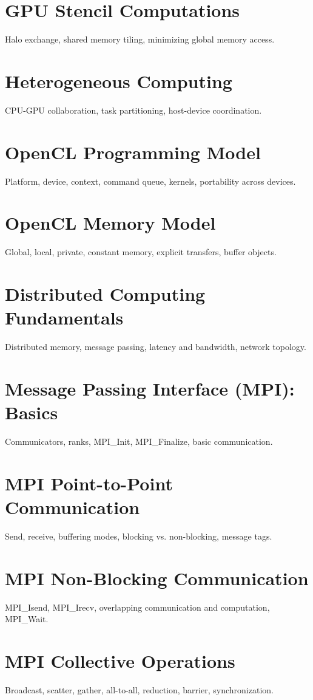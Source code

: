 \chapter{GPU Stencil Computations}
Halo exchange, shared memory tiling, minimizing global memory access.

\chapter{Heterogeneous Computing}
CPU-GPU collaboration, task partitioning, host-device coordination.

\chapter{OpenCL Programming Model}
Platform, device, context, command queue, kernels, portability across devices.

\chapter{OpenCL Memory Model}
Global, local, private, constant memory, explicit transfers, buffer objects.


\chapter{Distributed Computing Fundamentals}
Distributed memory, message passing, latency and bandwidth, network topology.

\chapter{Message Passing Interface (MPI): Basics}
Communicators, ranks, MPI\_Init, MPI\_Finalize, basic communication.

\chapter{MPI Point-to-Point Communication}
Send, receive, buffering modes, blocking vs. non-blocking, message tags.

\chapter{MPI Non-Blocking Communication}
MPI\_Isend, MPI\_Irecv, overlapping communication and computation, MPI\_Wait.

\chapter{MPI Collective Operations}
Broadcast, scatter, gather, all-to-all, reduction, barrier, synchronization.

